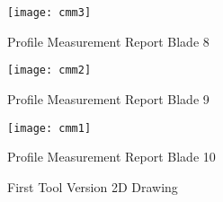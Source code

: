 \begin{figure}[H]
    \centering
    \texttt{[image: cmm3]}
    \caption{Profile Measurement Report Blade 8}
    \label{fig:cmm3}
\end{figure}

\begin{figure}[H]
    \centering
    \texttt{[image: cmm2]}
    \caption{Profile Measurement Report Blade 9}
    \label{fig:cmm2}
\end{figure}

\begin{figure}[H]
    \centering
    \texttt{[image: cmm1]}
    \caption{Profile Measurement Report Blade 10}
    \label{fig:cmm1}
\end{figure}

\begin{figure}[H]
    \centering
    \caption{First Tool Version 2D Drawing}
    \label{fig:anexo_2d_calhav1}
\end{figure}


\newcommand{\showcasecoversize}{0.3\textwidth}
\newcommand*{\myhfill}{}
\newcommand{\myincludeimage}[1]{%
    \myhfill%
    \defifundef{\mycvbox}{\newsavebox}%
    \savebox{\mycvbox}{\texttt{[image: \#1]}}%
    \defifundef{\mycvboxht}{\newlength}%
    \setlength{\mycvboxht}{\dimexpr \showcasecoversize*\paperheight/\paperwidth}%
    \rule{0pt}{1.1\mycvboxht}%
    \setlength{\fboxsep}{0pt}%
    \fbox{\texttt{[image: \#1]}}%
    \renewcommand*{\myhfill}{\hfill}%
}

